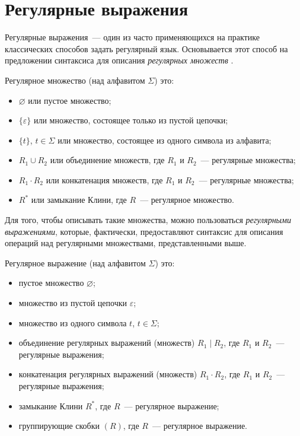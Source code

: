 \section{Регулярные выражения}
\label{sec:RegularExpressions}

Регулярные выражения~--- один из часто применяющихся на практике классических способов задать регулярный язык.
Основывается этот способ на предложении синтаксиса для описания \emph{регулярных множеств}%
.

\begin{definition}
    Регулярное множество (над алфавитом $\Sigma$) это:
    \begin{itemize}
        \item $\varnothing$ или пустое множество;
        \item $\{\varepsilon\}$ или множество, состоящее только из пустой цепочки;
        \item $\{t\}$, $t \in \Sigma$ или множество, состоящее из одного символа из алфавита;
        \item $R_1 \cup R_2$ или объединение множеств, где $R_1$ и $R_2$~--- регулярные множества;
        \item $R_1 \cdot R_2$ или конкатенация множеств, где $R_1$ и $R_2$~--- регулярные множества;
        \item $R^*$ или замыкание Клини, где $R$~--- регулярное множество.
    \end{itemize}
\end{definition}

Для того, чтобы описывать такие множества, можно пользоваться \emph{регулярными выражениями}, которые, фактически, предоставляют синтаксис для описания операций над регулярными множествами, представленными выше.

\begin{definition}
    Регулярное выражение (над алфавитом $\Sigma$) это:
    \begin{itemize}
        \item пустое множество $\varnothing$;
        \item множество из пустой цепочки $\varepsilon$;
        \item множество из одного символа $t$, $t \in \Sigma$;
        \item объединение регулярных выражений (множеств) $R_1 \mid R_2$, где $R_1$ и $R_2$~--- регулярные выражения;
        \item конкатенация регулярных выражений (множеств) $R_1 \cdot R_2$, где $R_1$ и $R_2$~--- регулярные выражения;
        \item замыкание Клини $R^*$, где $R$~--- регулярное выражение;
        \item группирующие скобки $(R)$, где $R$~--- регулярное выражение.
    \end{itemize}
\end{definition}

